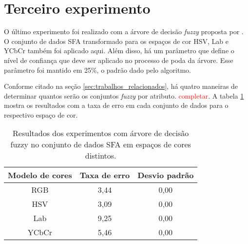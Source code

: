 \section{Terceiro experimento}
\label{sec:experimento_tres}
O último experimento foi realizado com a árvore de decisão \emph{fuzzy} proposta por \citet{cintra:13}. O conjunto de dados SFA transformado para os espaços de cor HSV, Lab e YCbCr também foi aplicado aqui. Além disso, há um parâmetro que define o nível de confiança que deve ser aplicado no processo de poda da árvore. Esse parâmetro foi mantido em 25\%, o padrão dado pelo algoritmo.

Conforme citado na seção \ref{sec:trabalhos_relacionados}, há quatro maneiras de determinar quantos serão os conjuntos \emph{fuzzy} por atributo. \textcolor{red}{completar}. A tabela \ref{tab:resultados_experimento_tres} mostra os resultados com a taxa de erro em cada conjunto de dados para o respectivo espaço de cor.


\begin{table}[!htpb]
\centering
\begin{small}
\setlength{\tabcolsep}{8pt}

\begin{tabular}{|c|c|c|}\hline
 Modelo de cores & Taxa de erro & Desvio padrão \\ \hline
 RGB   & 3,44 & 0,00 \\ \hline
 HSV   & 3,09 & 0,00 \\ \hline
 Lab   & 9,25 & 0,00 \\ \hline
 YCbCr & 5,46 & 0,00 \\ \hline

\end{tabular}
\end{small}
\caption[Resultados dos experimentos com árvore de decisão fuzzy no conjunto de dados SFA em espaços de cores distintos]{Resultados dos experimentos com árvore de decisão fuzzy no conjunto de dados SFA em espaços de cores distintos.}
\label{tab:resultados_experimento_tres}
\end{table}

